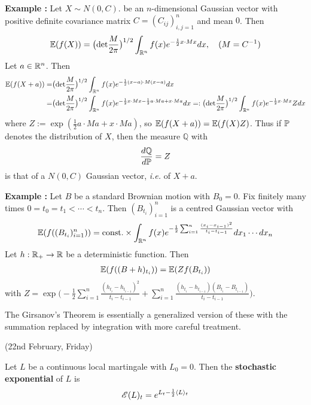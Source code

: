 \documentclass[12pt,a4paper]{article}
\begin{document}
\textbf{Example :} Let $X\sim N(0, C)$. be an $n$-dimensional Gaussian vector with positive definite covariance matrix $C= (C_{ij})_{i,j=1}^n$ and mean $0$. Then
\begin{align*}
\mathbb{E} (f(X)) = \big( \text{det} \frac{M}{2\pi} \big)^{1/2} \int_{\mathbb{R}^n} f(x) e^{-\frac{1}{2} x\cdot M x} dx, \quad (M = C^{-1})
\end{align*}
Let $a\in \mathbb{R}^n$. Then 
\begin{align*}
\mathbb{E} (f(X+a)) =& \big( \text{det} \frac{M}{2\pi} \big)^{1/2} \int_{\mathbb{R}^n} f(x) e^{-\frac{1}{2} (x-a)\cdot M (x-a)} dx \\
=& \big( \text{det} \frac{M}{2\pi} \big)^{1/2} \int_{\mathbb{R}^n} f(x) e^{- \frac{1}{2} x\cdot Mx - \frac{1}{2} a\cdot Ma + x\cdot M a} dx =: \big( \text{det} \frac{M}{2\pi} \big)^{1/2} \int_{\mathbb{R}^n} f(x) e^{- \frac{1}{2} x\cdot Mx} Z dx
\end{align*}
where $Z := \exp (\frac{1}{2} a\cdot Ma + x\cdot M a)$, so $\mathbb{E} (f(X+a)) = \mathbb{E} (f(X) Z)$. Thus if $\mathbb{P}$ denotes the distribution of $X$, then the measure $\mathbb{Q}$ with
\begin{align*}
\frac{d\mathbb{Q}}{d\mathbb{P}} = Z
\end{align*}
is that of a $N(0, C)$ Gaussian vector, \textit{i.e.} of $X+a$.
\s

\textbf{Example :} Let $B$ be a standard Brownian motion with $B_0 =0$. Fix finitely many times $0=t_0 = t_1 < \cdots < t_n$. Then $(B_{t_i})_{i=1}^n$ is a centred Gaussian vector with
\begin{align*}
\mathbb{E} (f((B_{t_i})_{i=1}^n)) = \text{const.} \times \int_{\mathbb{R}^n} f(x)e^{-\frac{1}{2} \sum_{i=1}^n \frac{(x_i - x_{i-1})^2}{t_i -t_{i-1}}} dx_1 \cdots dx_n 
\end{align*}
Let $h: \mathbb{R}_+ \rightarrow \mathbb{R}$ be a deterministic function. Then
\begin{align*}
\mathbb{E} (f((B + h)_{t_i})) = \mathbb{E}(Z f(B_{t_i}))
\end{align*}
with $Z= \exp \big( -\frac{1}{2}\sum_{i=1}^n \frac{(h_{t_i} - h_{t_{i-1}})^2}{t_i - t_{i-1}} + \sum_{i=1}^n \frac{(h_{t_i} - h_{t_{i-1}})(B_{t_i} - B_{t_{i-1}})}{t_i - t_{i-1}} \big)$.
\s

The Girsanov's Theorem is essentially a generalized version of these with the summation replaced by integration with more careful treatment.
\s

\newday

(22nd February, Friday)
\s

 Let $L$ be a continuous local martingale with $L_0 =0$. Then the \textbf{stochastic exponential} of $L$ is
\begin{align*}
\mathscr{E} (L)_t = e^{L_t - \frac{1}{2} \langle L \rangle_t}
\end{align*}
\end{document}
